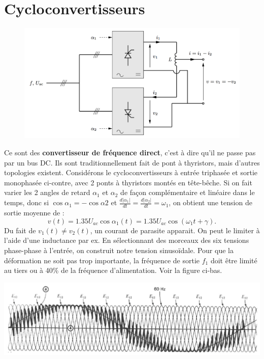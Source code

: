 	\section{Cycloconvertisseurs}
		\begin{figure}
		\vspace{-5mm}
		\includegraphics[scale=0.28]{ch3/14}
		\label{fig:3.14}
		\end{figure}
		Ce sont des \textbf{convertisseur de fréquence direct}, c'est à dire qu'il ne passe pas par un bus DC. Ils sont traditionnellement fait de pont à thyristors, mais d'autres topologies existent. Considérons le cycloconvertisseurs à entrée triphasée et sortie monophasée ci-contre, avec 2 ponts à thyristors montés en tête-bêche. Si on fait varier les 2 angles de retard $\alpha _1$ et $\alpha _2$ de façon complémentaire et linéaire dans le temps, donc si $\cos \alpha _1 = - \cos \alpha 2$ et $\frac{d|\alpha _1|}{dt} = \frac{d|\alpha _2|}{dt} = \omega _1$, on obtient une tension de sortie moyenne de : 
		\begin{equation}
			v(t) = 1.35 U_{ac} \cos \alpha _1 (t) = 1.35 U_{ac} \cos (\omega _1 t + \gamma). 
		\end{equation}
		Du fait de $v_1(t) \neq v_2(t)$, un courant de parasite apparait. On peut le limiter à l'aide d'une inductance par ex. En sélectionnant des morceaux des six tensions phase-phase à l'entrée, on construit notre tension sinusoïdale. Pour que la déformation ne soit pas trop importante, la fréquence de sortie $f_1$ doit être limité au tiers ou à 40\% de la fréquence d'alimentation. Voir la figure ci-bas. 
		
		\begin{center}
			\includegraphics[scale=0.3]{ch3/15}
		\end{center}